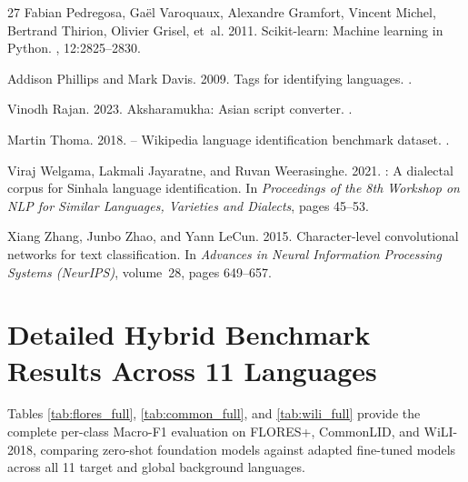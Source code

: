 \documentclass[11pt]{article}
\begin{document}
\begin{thebibliography}{27}
Fabian Pedregosa, Ga{\"{e}}l Varoquaux, Alexandre Gramfort, Vincent Michel, Bertrand Thirion, Olivier Grisel, et~al. 2011.
\newblock Scikit-learn: Machine learning in {P}ython.
, 12:2825--2830.

Addison Phillips and Mark Davis. 2009.
\newblock Tags for identifying languages.
.

Vinodh Rajan. 2023.
\newblock Aksharamukha: Asian script converter.
.

Martin Thoma. 2018.
 -- {Wikipedia} language identification benchmark dataset.
.

Viraj Welgama, Lakmali Jayaratne, and Ruvan Weerasinghe. 2021.
: A dialectal corpus for {Sinhala} language identification.
\newblock In {\em Proceedings of the 8th Workshop on NLP for Similar Languages, Varieties and Dialects}, pages 45--53.

Xiang Zhang, Junbo Zhao, and Yann LeCun. 2015.
\newblock Character-level convolutional networks for text classification.
\newblock In {\em Advances in Neural Information Processing Systems (NeurIPS)}, volume~28, pages 649--657.
\end{thebibliography}

\appendix
\section{Detailed Hybrid Benchmark Results Across 11 Languages}
\label{sec:appendix_tables}

Tables \ref{tab:flores_full}, \ref{tab:common_full}, and \ref{tab:wili_full} provide the complete per-class Macro-F1 evaluation on FLORES+, CommonLID, and WiLI-2018, comparing zero-shot foundation models against adapted fine-tuned models across all 11 target and global background languages.
\end{document}
